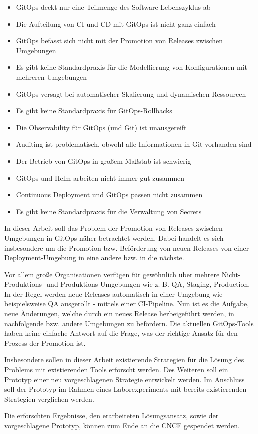 \begin{itemize}
	\item GitOps deckt nur eine Teilmenge des Software-Lebenszyklus ab
	\item Die Aufteilung von CI und CD mit GitOps ist nicht ganz einfach
	\item GitOps befasst sich nicht mit der Promotion von Releases zwischen Umgebungen
	\item Es gibt keine Standardpraxis für die Modellierung von Konfigurationen mit mehreren Umgebungen
	\item GitOps versagt bei automatischer Skalierung und dynamischen Ressourcen
	\item Es gibt keine Standardpraxis für GitOps-Rollbacks
	\item Die Observability für GitOps (und Git) ist unausgereift
	\item Auditing ist problematisch, obwohl alle Informationen in Git vorhanden sind
	\item Der Betrieb von GitOps in großem Maßstab ist schwierig
	\item GitOps und Helm arbeiten nicht immer gut zusammen
	\item Continuous Deployment und GitOps passen nicht zusammen
	\item Es gibt keine Standardpraxis für die Verwaltung von Secrets
\end{itemize}

\autocite{codefreshGitopsPains10}
\bigskip




In dieser Arbeit soll das Problem der
Promotion von Releases zwischen Umgebungen in GitOps
näher betrachtet werden.
Dabei handelt es sich insbesondere um
die Promotion bzw. Beförderung von neuen Releases
von einer Deployment-Umgebung in eine andere bzw. in die nächste.
\bigskip

Vor allem große Organisationen verfügen für gewöhnlich über mehrere
Nicht-Produktions- und Produktions-Umgebungen
wie z. B. QA, Staging, Production.
In der Regel werden neue Releases automatisch in einer Umgebung
wie beispielsweise QA ausgerollt - mittels einer CI-Pipeline.
Nun ist es die Aufgabe,
neue Änderungen, welche durch ein neues Release herbeigeführt werden,
in nachfolgende bzw. andere Umgebungen zu befördern.
Die aktuellen GitOps-Tools haben keine einfache Antwort auf
die Frage, was der richtige Ansatz für den Prozess der Promotion ist.
\bigskip

Insbesondere sollen in dieser Arbeit
existierende Strategien für die Lösung des Problems
mit existierenden Tools erforscht werden.
Des Weiteren soll ein Prototyp einer neu vorgeschlagenen
Strategie entwickelt werden.
Im Anschluss soll der Prototyp im Rahmen eines Laborexperiments
mit bereits existierenden Strategien
verglichen werden.
\bigskip

Die erforschten Ergebnisse,
den erarbeiteten Lösungsansatz,
sowie der vorgeschlagene Prototyp,
können zum Ende
an die CNCF gespendet werden.
